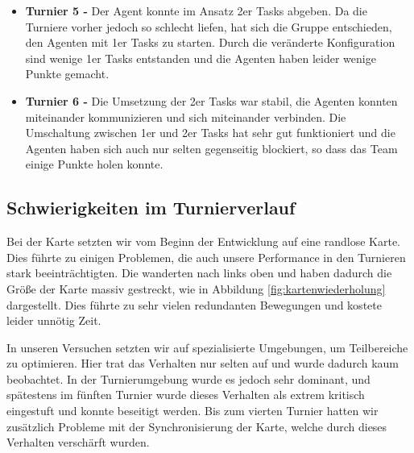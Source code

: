 \begin{itemize}
	\item \textbf{Turnier 5 -} Der Agent konnte im Ansatz 2er Tasks abgeben. Da die Turniere vorher jedoch so schlecht liefen, hat sich die Gruppe entschieden, den Agenten mit 1er Tasks zu starten. Durch die veränderte Konfiguration sind wenige 1er Tasks entstanden und die Agenten haben leider wenige Punkte gemacht. \newline
	
	\item \textbf{Turnier 6 -} 	Die Umsetzung der 2er Tasks war stabil, die Agenten konnten miteinander kommunizieren und sich miteinander verbinden. Die Umschaltung zwischen 1er und 2er Tasks hat sehr gut funktioniert und die Agenten haben sich auch nur selten gegenseitig blockiert, so dass das Team einige Punkte holen konnte. \newline

\end{itemize}

\subsection{Schwierigkeiten im Turnierverlauf}
Bei der Karte setzten wir vom Beginn der Entwicklung auf eine randlose Karte. Dies führte zu einigen Problemen, die auch unsere Performance in den Turnieren stark beeinträchtigten. Die \Agents wanderten nach links oben und haben dadurch die Größe der Karte massiv gestreckt, wie in Abbildung \ref{fig:kartenwiederholung} dargestellt. Dies führte zu sehr vielen redundanten Bewegungen und kostete leider unnötig Zeit.  \newline

In unseren Versuchen setzten wir auf spezialisierte Umgebungen, um Teilbereiche zu optimieren. Hier trat das Verhalten nur selten auf und wurde dadurch kaum beobachtet. In der Turnierumgebung wurde es jedoch sehr dominant, und spätestens im fünften Turnier wurde dieses Verhalten als extrem kritisch eingestuft und konnte beseitigt werden. Bis zum vierten Turnier hatten wir zusätzlich Probleme mit der Synchronisierung der Karte, welche durch dieses Verhalten verschärft wurden. \newline




